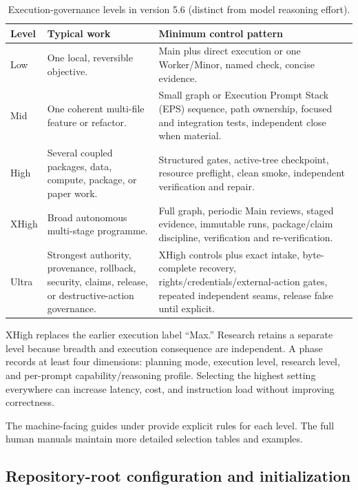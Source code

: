 \documentclass[11pt,a4paper]{article}
\newcommand{\code}[1]{\texttt{\detokenize{#1}}}
\begin{document}
\begin{table}[H]
\centering
\caption{Execution-governance levels in version 5.6 (distinct from model reasoning effort).}
\begin{tabularx}{\textwidth}{P{0.11\textwidth}P{0.25\textwidth}Y}
\toprule
\textbf{Level} & \textbf{Typical work} & \textbf{Minimum control pattern} \\
\midrule
Low & One local, reversible objective. & Main plus direct execution or one Worker/Minor, named check, concise evidence. \\
Mid & One coherent multi-file feature or refactor. & Small graph or Execution Prompt Stack (EPS) sequence, path ownership, focused and integration tests, independent close when material. \\
High & Several coupled packages, data, compute, package, or paper work. & Structured gates, active-tree checkpoint, resource preflight, clean smoke, independent verification and repair. \\
XHigh & Broad autonomous multi-stage programme. & Full graph, periodic Main reviews, staged evidence, immutable runs, package/claim discipline, verification and re-verification. \\
Ultra & Strongest authority, provenance, rollback, security, claims, release, or destructive-action governance. & XHigh controls plus exact intake, byte-complete recovery, rights/credentials/external-action gates, repeated independent seams, release false until explicit. \\
\bottomrule
\end{tabularx}
\end{table}

XHigh replaces the earlier execution label ``Max.'' Research retains a separate \code{max} level
because breadth and execution consequence are independent. A phase records at least four dimensions:
planning mode, execution level, research level, and per-prompt capability/reasoning profile.
Selecting the highest setting everywhere can increase latency, cost, and instruction load without
improving correctness.

The machine-facing guides under  provide explicit rules
for each level. The full human manuals maintain more detailed selection tables and examples.

\subsection{Repository-root configuration and initialization}\label{sec:cli-start}
\end{document}
